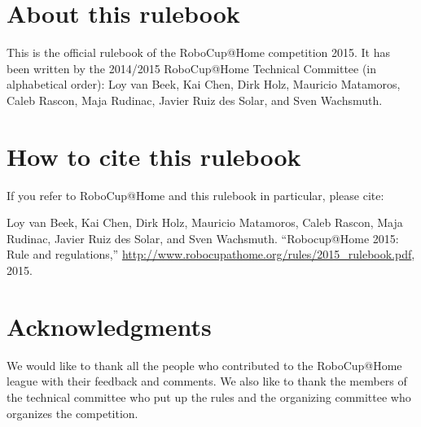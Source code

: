 


\section*{About this rulebook}
This is the official rulebook of the RoboCup@Home competition 2015.
It has been written by the 2014/2015 RoboCup@Home Technical Committee (in alphabetical order): 
Loy van Beek, 
Kai Chen, 
Dirk Holz,  
Mauricio Matamoros, 
Caleb Rascon, 
Maja Rudinac, 
Javier Ruiz des Solar, and 
Sven Wachsmuth.

\section*{How to cite this rulebook}
If you refer to RoboCup@Home and this rulebook in particular, please cite:

Loy van Beek, Kai Chen, Dirk Holz, Mauricio Matamoros, Caleb Rascon, Maja Rudinac, Javier Ruiz des Solar, and Sven Wachsmuth. 
``Robocup@Home 2015: Rule and regulations,'' 
\url{http://www.robocupathome.org/rules/2015_rulebook.pdf}, 2015.



\section*{Acknowledgments}
\label{sec:acknowledgments}


We would like to thank all the people who contributed to the RoboCup@Home league 
with their feedback and comments. 
We also like to thank the members of the technical committee who put up the rules
and the organizing committee who organizes the competition.  

